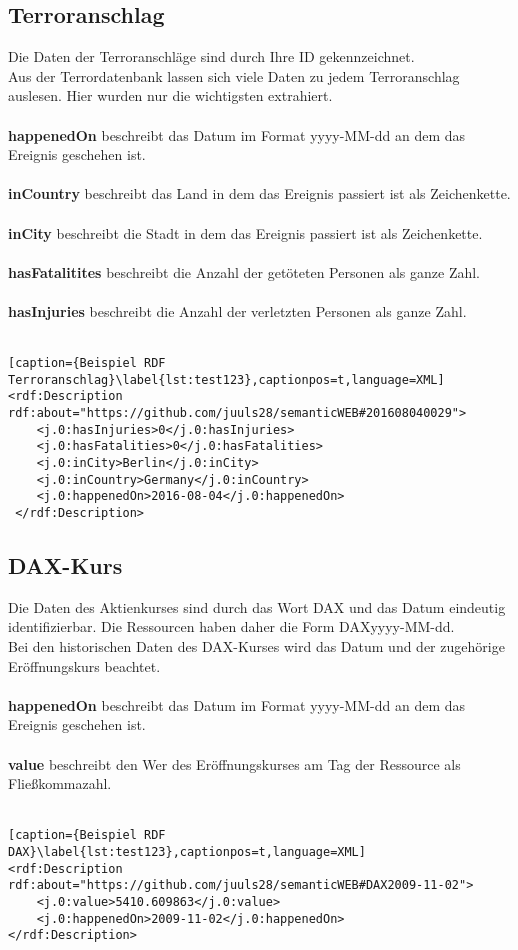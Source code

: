 \documentclass[a4paper,10pt,parskip]{article}
\begin{document}
\subsection{Terroranschlag}
Die Daten der Terroranschläge sind durch Ihre ID gekennzeichnet.\\
Aus der Terrordatenbank lassen sich viele Daten zu jedem Terroranschlag auslesen. Hier wurden nur die wichtigsten extrahiert.\\
\\
\textbf{happenedOn} beschreibt das Datum im Format yyyy-MM-dd an dem das Ereignis geschehen ist.\\
\\
\textbf{inCountry} beschreibt das Land in dem das Ereignis passiert ist als Zeichenkette.\\
\\
\textbf{inCity} beschreibt die Stadt in dem das Ereignis passiert ist als Zeichenkette.\\
\\
\textbf{hasFatalitites} beschreibt die Anzahl der getöteten Personen als ganze Zahl.\\
\\
\textbf{hasInjuries} beschreibt die Anzahl der verletzten Personen als ganze Zahl.\\
\\
\begin{lstlisting}[caption={Beispiel RDF Terroranschlag}\label{lst:test123},captionpos=t,language=XML] 
<rdf:Description rdf:about="https://github.com/juuls28/semanticWEB#201608040029">
    <j.0:hasInjuries>0</j.0:hasInjuries>
    <j.0:hasFatalities>0</j.0:hasFatalities>
    <j.0:inCity>Berlin</j.0:inCity>
    <j.0:inCountry>Germany</j.0:inCountry>
    <j.0:happenedOn>2016-08-04</j.0:happenedOn>
 </rdf:Description>
\end{lstlisting}
\subsection{DAX-Kurs}
Die Daten des Aktienkurses sind durch das Wort DAX und das Datum eindeutig identifizierbar. Die Ressourcen haben daher die Form DAXyyyy-MM-dd.\\
Bei den historischen Daten des DAX-Kurses wird das Datum und der zugehörige Eröffnungskurs beachtet.\\
\\
\textbf{happenedOn} beschreibt das Datum im Format yyyy-MM-dd an dem das Ereignis geschehen ist.\\
\\
\textbf{value} beschreibt den Wer des Eröffnungskurses am Tag der Ressource als Fließkommazahl.\\
\\
\begin{lstlisting}[caption={Beispiel RDF DAX}\label{lst:test123},captionpos=t,language=XML] 
<rdf:Description rdf:about="https://github.com/juuls28/semanticWEB#DAX2009-11-02">
    <j.0:value>5410.609863</j.0:value>
    <j.0:happenedOn>2009-11-02</j.0:happenedOn>
</rdf:Description>
\end{lstlisting}
\end{document}
